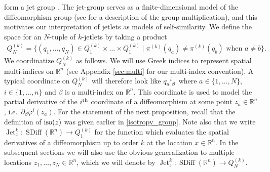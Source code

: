\documentclass[12pt]{amsart}
\newcommand{\R}{\ensuremath{\mathbb{R}}}
\DeclareMathOperator{\SDiff}{SDiff}
\DeclareMathOperator{\Jet}{Jet}
\begin{document}
  form a jet group \cite{JacobsRatiuDesbrun2013}.
  The jet-group serves as a finite-dimensional model of the diffeomorphism group (see \cite[Chapter 4]{KMS99} for a description of the group multiplication),
  and this motivates our interpretation of jetlets as models of self-similarity.
  We define the space for an $N$-tuple of $k$-jetlets by taking a product
  \begin{align*}
    Q^{(k)}_N = \{ (q_1,\dots, q_N) \in Q_1^{(k)} \times \dots \times Q_1^{(k)}
    \mid \pi^{(k)}(q_a) \neq \pi^{(k)}(q_b) \text{ when } a \neq b \}.
  \end{align*}
  We coordinatize $Q^{(k)}_N$ as follows.
  We will use Greek indices to represent spatial
  multi-indices on $\R^n$ (see Appendix \ref{sec:multi} for our multi-index convention).
  A typical coordinate on $Q^{(k)}_N$ will therefore look
  like $q\indices{_a^i_\beta}$ where $a \in \{1,\dots,N\}$, $i \in \{ 1 , \dots, n \}$
  and $\beta$ is a multi-index on $\R^n$.
  This coordinate is used to model the partial derivative of the $i^{\rm th}$ coordinate
  of a diffeomorphism at some point $z_a \in \R^n$, i.e.\ $\partial_\beta \varphi^i(z_a)$.
  For the statement of the next proposition, recall that the definition  of ${\rm iso}(z)$ was given earlier in \eqref{isotropy_group}. Note also that we write $\Jet^k_x: \SDiff(\R^n) \to Q_1^{(k)}$ for
    the function which evaluates the spatial derivatives
    of a diffeomorphism up to order $k$ at the location $x \in \R^n$. In the subsequent sections we will also use the obvious generalization to multiple locations $z_1, \ldots, z_N \in \R^n$, which we will denote by $\Jet^k_z : \SDiff(\R^n) \to Q_N^{(k)}$.  
\end{document}
